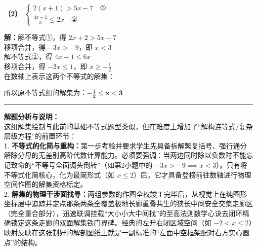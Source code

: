 \begin{minipage}{0.48\textwidth}
\textbf{（2）} $\begin{cases} 2(x+1) > 5x - 7 \quad \text{①} \\ \frac{4x-1}{3} \leqslant 2x \quad \text{②} \end{cases}$

\vspace{0.1cm}

\textbf{解：}解不等式①，得 $2x + 2 > 5x - 7$ \\
移项合并，得 $-3x > -9$，即 $x < 3$ \\
解不等式②，得 $4x - 1 \leqslant 6x$ \\
移项合并，得 $-2x \leqslant 1$，即 $x \geqslant -\frac{1}{2}$ \\
在数轴上表示这两个不等式的解集：

\vspace{0.2cm}
\begin{center}
\end{center}
所以原不等式组的解集为：$\boldsymbol{-\frac{1}{2} \leqslant x < 3}$
\end{minipage}

\vspace{0.6cm}
\hrule
\vspace{0.4cm}

{\small\color{gray}
\textbf{解题分析与说明：}\\
这组解集绘制与此前的基础不等式题型类似，但在难度上增加了“解构连等式/复杂层级方程”的前置环节：\\
1. \textbf{不等式的化简与重构：}第一步考验并要求学生先具备拆解繁复括号、强行通分解除分母的无差别高阶代数计算能力。必须要强调：当两边同时除以负数时不能忘记致命的“不等号全面调头倒转”（如第2小题中的 $-3x > -9 \implies x < 3$）。只有将不等式化简核心，化为最简形式（如 $x \leqslant 2$）后，它才具备登榜前往数轴进行物理空间作图的解集资格标定。\\
2. \textbf{解集的物理干涉面找寻：}两组参数的作图全权竣工完毕后，从视觉上在纯图形坐标层中追踪并定点那条两条全覆盖极地长廊重叠共生的狭长中间安全交集走廊区（完全重合部分），迅速联调挂载“大小小大中间找”的至高法则数学心诀去闭环精确锁定这条走廊的双面解集铁门界碑。经典的左开右闭区域空间（如 $-2 < x \leqslant 2$）映射反映在这张制好的解剖图纸上就是一副标准的“左面中空框架配对右方实心圆点”的结构。
}

